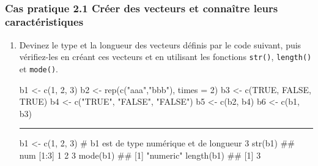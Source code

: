 \documentclass[12pt,twosided, notitlepage]{book}
\newenvironment{Shaded}{}{}
\newcommand{\CommentTok}[1]{\textcolor[rgb]{0.00,0.50,0.00}{#1}}
\newcommand{\DataTypeTok}[1]{#1}
\newcommand{\DecValTok}[1]{#1}
\newcommand{\KeywordTok}[1]{\textcolor[rgb]{0.00,0.00,1.00}{#1}}
\newcommand{\NormalTok}[1]{#1}
\newcommand{\OtherTok}[1]{\textcolor[rgb]{1.00,0.25,0.00}{#1}}
\newcommand{\StringTok}[1]{\textcolor[rgb]{0.00,0.50,0.50}{#1}}
\newif \ifsol
\renewenvironment{Shaded}{\begin{snugshade}}{\end{snugshade}}
\begin{document}
~

\hypertarget{cas-pratique-2.1-creer-des-vecteurs-et-connaitre-leurs-caracteristiques}{%
\subsubsection{\texorpdfstring{\textbf{Cas pratique 2.1} Créer des
vecteurs et connaître leurs
caractéristiques}{Cas pratique 2.1 Créer des vecteurs et connaître leurs caractéristiques}}\label{cas-pratique-2.1-creer-des-vecteurs-et-connaitre-leurs-caracteristiques}}


\begin{enumerate}
\def\labelenumi{\alph{enumi}.}
\item
  Devinez le type et la longueur des vecteurs définis par le code
  suivant, puis vérifiez-les en créant ces vecteurs et en utilisant les
  fonctions \texttt{str()},
  \texttt{length()} et
  \texttt{mode()}.

\begin{Shaded}
\begin{Highlighting}[]
\NormalTok{b1 <-}\StringTok{ }\KeywordTok{c}\NormalTok{(}\DecValTok{1}\NormalTok{, }\DecValTok{2}\NormalTok{, }\DecValTok{3}\NormalTok{)}
\NormalTok{b2 <-}\StringTok{ }\KeywordTok{rep}\NormalTok{(}\KeywordTok{c}\NormalTok{(}\StringTok{"aaa"}\NormalTok{,}\StringTok{"bbb"}\NormalTok{), }\DataTypeTok{times =} \DecValTok{2}\NormalTok{)}
\NormalTok{b3 <-}\StringTok{ }\KeywordTok{c}\NormalTok{(}\OtherTok{TRUE}\NormalTok{, }\OtherTok{FALSE}\NormalTok{, }\OtherTok{TRUE}\NormalTok{)}
\NormalTok{b4 <-}\StringTok{ }\KeywordTok{c}\NormalTok{(}\StringTok{"TRUE"}\NormalTok{, }\StringTok{"FALSE"}\NormalTok{, }\StringTok{"FALSE"}\NormalTok{)}
\NormalTok{b5 <-}\StringTok{ }\KeywordTok{c}\NormalTok{(b2, b4)}
\NormalTok{b6 <-}\StringTok{ }\KeywordTok{c}\NormalTok{(b1, b3)}
\end{Highlighting}
\end{Shaded}

  \ifsol 

  \begin{center} \rule{0.5\linewidth}{\linethickness}\end{center}

\begin{Shaded}
\begin{Highlighting}[]
\NormalTok{b1 <-}\StringTok{ }\KeywordTok{c}\NormalTok{(}\DecValTok{1}\NormalTok{, }\DecValTok{2}\NormalTok{, }\DecValTok{3}\NormalTok{)}
\CommentTok{# b1 est de type numérique et de longueur 3}
\KeywordTok{str}\NormalTok{(b1)}
\NormalTok{  ##  num [1:3] 1 2 3}
\KeywordTok{mode}\NormalTok{(b1)}
\NormalTok{  ## [1] "numeric"}
\KeywordTok{length}\NormalTok{(b1)}
\NormalTok{  ## [1] 3}


\end{Highlighting}
\end{Shaded}
\end{enumerate}
\end{document}
